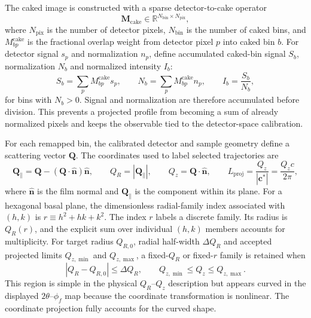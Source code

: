 The caked image is constructed with a sparse detector-to-cake operator
\begin{equation}
\mathbf M_{\mathrm{cake}}\in \mathbb{R}^{N_{\mathrm{bin}}\times N_{\mathrm{pix}}},
\end{equation}
where $N_{\mathrm{pix}}$ is the number of detector pixels, $N_{\mathrm{bin}}$ is the number of caked bins, and $M^{\mathrm{cake}}_{bp}$ is the fractional overlap weight from detector pixel $p$ into caked bin $b$. For detector signal $s_p$ and normalization $n_p$, define accumulated caked-bin signal $S_b$, normalization $N_b$ and normalized intensity $I_b$:
\begin{equation}
S_b=\sum_p M^{\mathrm{cake}}_{bp}s_p,
\qquad
N_b=\sum_p M^{\mathrm{cake}}_{bp}n_p,
\qquad
I_b=\frac{S_b}{N_b},
\end{equation}
for bins with $N_b>0$. Signal and normalization are therefore accumulated before division. This prevents a projected profile from becoming a sum of already normalized pixels and keeps the observable tied to the detector-space calibration.

For each remapped bin, the calibrated detector and sample geometry define a scattering vector $\mathbf Q$. The coordinates used to label selected trajectories are
\begin{equation}
\mathbf Q_{\parallel}
=\mathbf Q-(\mathbf Q\cdot\hat{\mathbf n})\hat{\mathbf n},
\qquad
Q_R=|\mathbf Q_{\parallel}|,
\qquad
Q_z=\mathbf Q\cdot \hat{\mathbf n},
\qquad
L_{\mathrm{proj}}=\frac{Q_z}{|\mathbf c^{*}|}=\frac{Q_z c}{2\pi},
\end{equation}
where $\hat{\mathbf n}$ is the film normal and $\mathbf Q_{\parallel}$ is the component within its plane. For a hexagonal basal plane, the dimensionless radial-family index associated with $(h,k)$ is $r\equiv h^2+hk+k^2$. The index $r$ labels a discrete family. Its radius is $Q_R(r)$, and the explicit sum over individual $(h,k)$ members accounts for multiplicity. For target radius $Q_{R,0}$, radial half-width $\Delta Q_R$ and accepted projected limits $Q_{z,\min}$ and $Q_{z,\max}$, a fixed-$Q_R$ or fixed-$r$ family is retained when
\begin{equation}
|Q_R-Q_{R,0}|\le \Delta Q_R,
\qquad
Q_{z,\min}\le Q_z\le Q_{z,\max}.
\end{equation}
This region is simple in the physical $Q_R$--$Q_z$ description but appears curved in the displayed $2\theta$--$\phi_f$ map because the coordinate transformation is nonlinear. The coordinate projection fully accounts for the curved shape.

